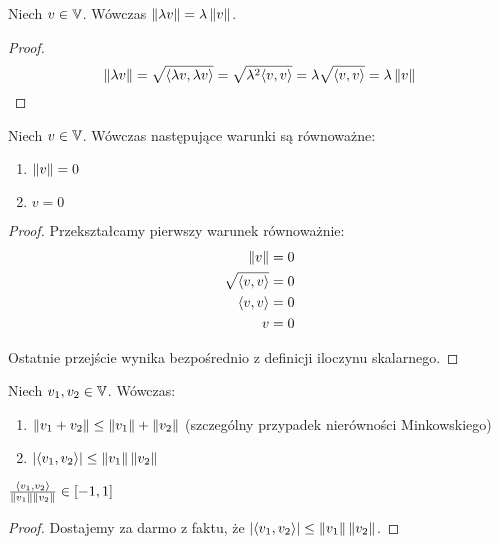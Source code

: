 \begin{fact}
	Niech \(v \in \mathbb{V}\). Wówczas \( \left\Vert \lambda v \right\Vert = \lambda \left\Vert v \right\Vert\).

\end{fact}
\begin{proof}
	\[
		\left\Vert \lambda v \right\Vert = \sqrt{\langle \lambda v, \lambda v \rangle} = \sqrt{\lambda^2 \langle v, v \rangle} = \lambda \sqrt{\langle v, v \rangle} = \lambda \left\Vert v \right\Vert
	\]
\end{proof}
\begin{fact}
	Niech \(v \in \mathbb{V}\). Wówczas następujące warunki są równoważne:

	\begin{enumerate}
		\item \(\left\Vert v \right\Vert = 0\)
		\item \(v = 0\)
	\end{enumerate}

\end{fact}
\begin{proof}
	Przekształcamy pierwszy warunek równoważnie:
	\begin{align*}
		\left\Vert v \right\Vert = 0             \\
		\sqrt{\langle v, v \rangle} = 0 \\
		\langle v, v \rangle = 0        \\
		v = 0
	\end{align*}

	Ostatnie przejście wynika bezpośrednio z definicji iloczynu skalarnego.
\end{proof}

\begin{fact}
	Niech \(v_1, v_2 \in \mathbb{V}\). Wówczas:

	\begin{enumerate}
		\item \(\left\Vert v_1 + v_2 \right\Vert \leq \left\Vert v_1 \right\Vert + \left\Vert v_2 \right\Vert\) (szczególny przypadek nierówności Minkowskiego)
		\item \( | \langle v_1, v_2 \rangle | \leq \left\Vert v_1 \right\Vert \left\Vert v_2 \right\Vert \)
	\end{enumerate}

\end{fact}

\begin{fact}
	\( \frac{\langle v_1, v_2 \rangle}{\left\Vert v_1 \right\Vert \left\Vert v_2 \right\Vert} \in [-1, 1] \)
\end{fact}
\begin{proof}
	Dostajemy za darmo z faktu, że \( | \langle v_1, v_2 \rangle | \leq \left\Vert v_1 \right\Vert \left\Vert v_2 \right\Vert \).
\end{proof}

